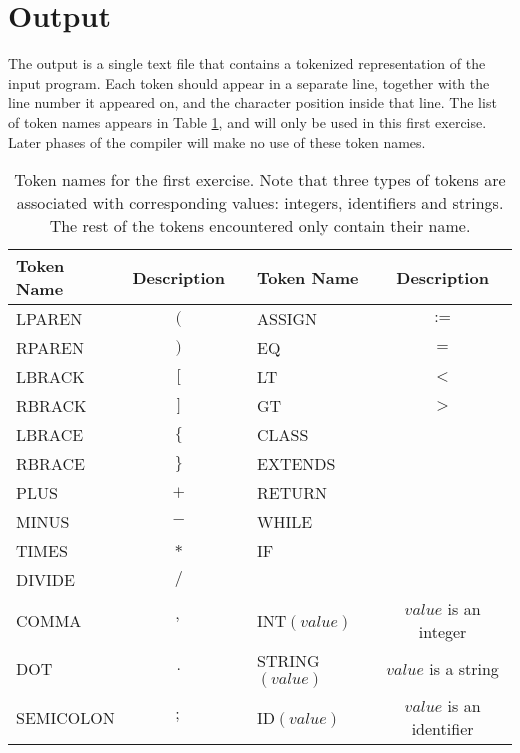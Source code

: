 \documentclass{article}
\begin{document}
\section{Output}
The output is a single text file that contains a tokenized representation of the input program.
Each token should appear in a separate line, together with the line number
it appeared on, and the character position inside that line.
The list of token names appears in Table \ref{Table_Token_Names_For_Exercise_1},
and will only be used in this first exercise.
Later phases of the compiler will make no use of these token names.
\begin{table}[h]
\centering
\begin{tabular}{|l|c|c|l|c|}
  \hline
  Token Name & Description & & Token Name & Description \\
  \hline
  \hline
  LPAREN    & $($  & & ASSIGN           & $:=$                     \\
  RPAREN    & $)$  & & EQ               & $=$                      \\
  LBRACK    & $[$  & & LT               & $<$                      \\
  RBRACK    & $]$  & & GT               & $>$                      \\
  LBRACE    & $\{$ & & CLASS            &                          \\
  RBRACE    & $\}$ & & EXTENDS          &                          \\
  PLUS      & $+$  & & RETURN           &                          \\
  MINUS     & $-$  & & WHILE            &                          \\
  TIMES     & $*$  & & IF               &                          \\
  DIVIDE    & $/$  & &                  &                          \\
  COMMA     & $,$  & & INT$(value)$     & $value$ is an integer    \\
  DOT       & $.$  & & STRING$(value)$  & $value$ is a string      \\
  SEMICOLON & $;$  & & ID$(value)$      & $value$ is an identifier \\
  \hline
\end{tabular}
\caption{
Token names for the first exercise.
Note that three types of tokens are associated with corresponding values:
integers, identifiers and strings.
The rest of the tokens encountered only contain their name.
\label{Table_Token_Names_For_Exercise_1}}
\end{table}
\end{document}
